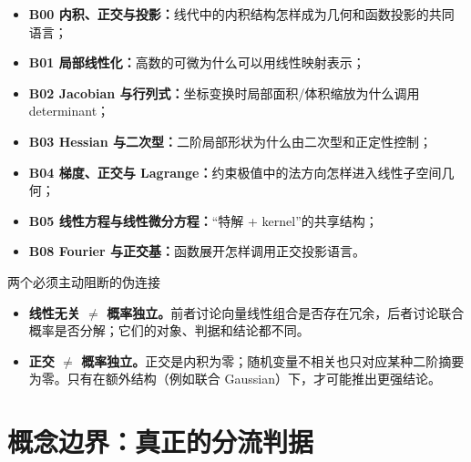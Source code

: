 \documentclass[11pt,a4paper]{ctexart}
\newcommand{\kw}[1]{\textbf{\color{deep}#1}}
\begin{document}
\begin{itemize}
  \item \kw{B00 内积、正交与投影：}线代中的内积结构怎样成为几何和函数投影的共同语言；
  \item \kw{B01 局部线性化：}高数的可微为什么可以用线性映射表示；
  \item \kw{B02 Jacobian 与行列式：}坐标变换时局部面积/体积缩放为什么调用 determinant；
  \item \kw{B03 Hessian 与二次型：}二阶局部形状为什么由二次型和正定性控制；
  \item \kw{B04 梯度、正交与 Lagrange：}约束极值中的法方向怎样进入线性子空间几何；
  \item \kw{B05 线性方程与线性微分方程：}“特解 + kernel”的共享结构；
  \item \kw{B08 Fourier 与正交基：}函数展开怎样调用正交投影语言。
\end{itemize}

\begin{warnbox}{两个必须主动阻断的伪连接}
\begin{itemize}
  \item \kw{线性无关 $\neq$ 概率独立。}前者讨论向量线性组合是否存在冗余，后者讨论联合概率是否分解；它们的对象、判据和结论都不同。
  \item \kw{正交 $\neq$ 概率独立。}正交是内积为零；随机变量不相关也只对应某种二阶摘要为零。只有在额外结构（例如联合 Gaussian）下，才可能推出更强结论。
\end{itemize}
\end{warnbox}

\section{概念边界：真正的分流判据}
\end{document}

